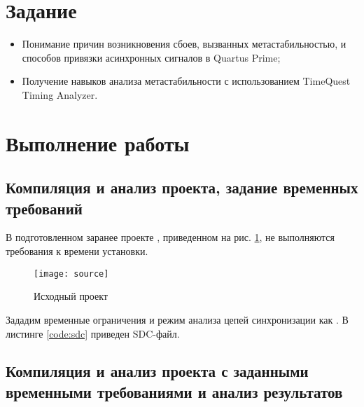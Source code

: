 





\tableofcontents
\listoffigures
\lstlistoflistings
\listoftables
\newpage

\section{Задание}

\begin{itemize}
	\item Понимание причин возникновения сбоев, вызванных метастабильностью, и способов привязки асинхронных сигналов в Quartus Prime;
	\item Получение навыков анализа метастабильности с использованием TimeQuest Timing Analyzer.
\end{itemize}

\section{Выполнение работы}

\subsection{Компиляция и анализ проекта, задание временных требований}

В подготовленном заранее проекте , приведенном на рис. \ref{fig:source}, не выполняются требования к времени установки.
\begin{figure}[H]
	\begin{center}
		\texttt{[image: source]}
		\caption{Исходный проект}
		\label{fig:source}
	\end{center}
\end{figure}

Зададим временные ограничения и режим анализа цепей синхронизации как . В листинге \ref{code:sdc} приведен SDC-файл.

\vspace{0.5cm}


\newpage

\subsection{Компиляция и анализ проекта с заданными временными требованиями и анализ результатов}

